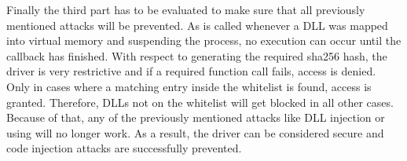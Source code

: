 Finally the third part has to be evaluated to make sure that all previously mentioned attacks will be prevented. As  is called whenever a \gls{DLL} was mapped into virtual memory and suspending the process, no execution can occur until the callback has finished. With respect to generating the required sha256 hash, the driver is very restrictive and if a required function call fails, access is denied. Only in cases where a matching entry inside the whitelist is found, access is granted. Therefore, \glspl{DLL} not on the whitelist will get blocked in all other cases. Because of that, any of the previously mentioned attacks like \gls{DLL} injection or using  will no longer work. As a result, the driver can be considered secure and code injection attacks are successfully prevented.